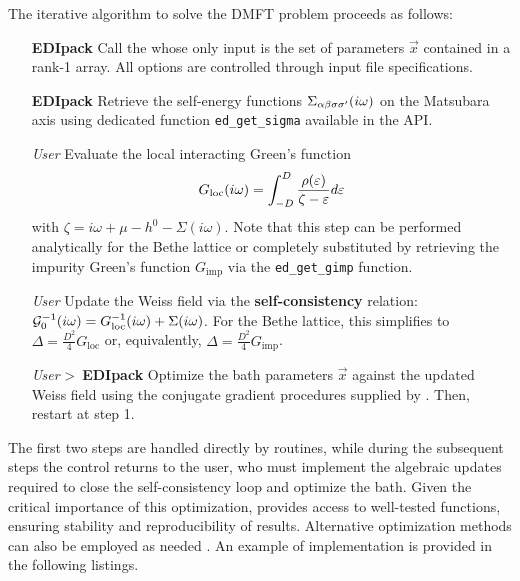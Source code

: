 \documentclass[edipack_sp.tex]{subfiles}
\begin{document}
The iterative algorithm to solve the DMFT problem proceeds as follows:
\begin{itemize}  
\item[{\tiny {\bf EDIpack}}] Call the 
  whose only input is the set of parameters $\vec{x}$ contained in a
  rank-1 array. All  \NAME options are controlled through input file
  specifications.
  
\item[{\tiny {\bf EDIpack}}] Retrieve the self-energy functions $\Sigma_{\alpha\beta\sigma\sigma'}(i\omega)$ on the
  Matsubara axis using dedicated function {\tt ed\_get\_sigma} available in the \NAME API.
  
\item[{\tiny {\it User}}] Evaluate the local interacting Green's function
$$
G_\mathrm{loc}(i\omega) = \int_{-D}^D \frac{\rho(\varepsilon)}{\zeta -\varepsilon}d\varepsilon
$$ 
with  $\zeta=i\omega+\mu-h^0-\Sigma(i\omega)$. Note that this step can be performed analytically for the Bethe lattice \cite{Georges1996RMP} or completely substituted by retrieving the impurity Green's function $G_\mathrm{imp}$ via the {\tt ed\_get\_gimp} function.
  
\item[{\tiny {\it User}}] Update the Weiss field via the {\bf self-consistency}
  relation: ${\cal G}^{-1}_0(i\omega) = G^{-1}_\mathrm{loc}(i\omega) +
    \Sigma(i\omega)$. For the Bethe lattice, this simplifies to
    $\Delta = \tfrac{D^2}{4}G_\mathrm{loc}$ or, equivalently, $\Delta = \tfrac{D^2}{4}G_\mathrm{imp}$.
    
  \item[{\tiny {\it User} \textgreater\ {\bf EDIpack}}] Optimize the bath parameters $\vec{x}$ against the updated
    Weiss field using the conjugate gradient procedures supplied by \NAME. Then, restart at step 1.
\end{itemize}

The first two steps are handled directly by \NAME routines, while during the subsequent steps the 
 control returns to the user, who must implement the algebraic updates required to 
close the self-consistency loop and optimize the bath.
Given the 
critical importance of this optimization, \NAME provides access to 
well-tested functions, ensuring stability and reproducibility of 
results. Alternative optimization methods can also be employed as 
needed \cite{Mejuto-Zaera2020PRB,Huang2023PRB,Nakatsukasa2018SJOSC}. 
An example of implementation is provided in the following listings.
\end{document}
